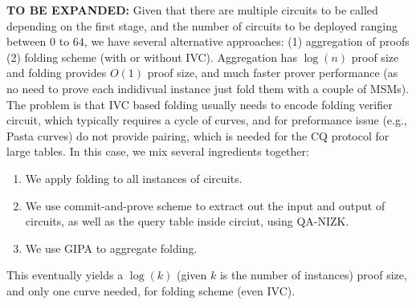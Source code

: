 {\bf TO BE EXPANDED:} Given that there are multiple circuits to
be called depending on the first stage, and the number of circuits
to be deployed ranging between $0$ to $64$, we have several alternative
approaches: (1) aggregation of proofs (2) folding scheme (with
or without IVC). Aggregation has $\log(n)$ proof size
and folding provides $O(1)$ proof size, and much faster prover
performance (as no need to prove each indidivual instance just
fold them with a couple of MSMs).  The problem is that
IVC based folding usually needs to encode folding verifier circuit,
which typically requires a cycle of curves, and for preformance issue
(e.g., Pasta curves) do not provide pairing, which is needed for
the CQ protocol for large tables. In this case, we mix several
ingredients together:
\begin{enumerate}
 \item We apply folding to all instances of circuits.
 \item We use commit-and-prove scheme to extract out the
 	input and output of circuits, as well as the query table
	inside circiut, using QA-NIZK.
 \item We use GIPA to aggregate folding.
\end{enumerate}

This eventually yields a $\log(k)$ (given $k$ is the number of
instances) proof size, and only one curve needed, for
folding scheme (even IVC).

